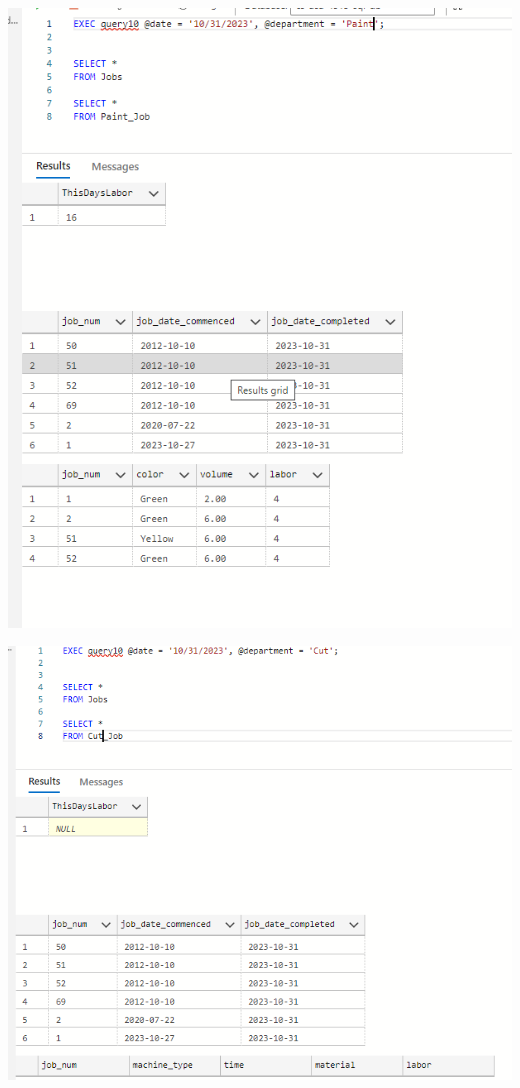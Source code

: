 \documentclass[11pt]{article}
\begin{document}
\begin{enumerate}
\includegraphics[width = \textwidth]{deptjob2.png}

\includegraphics[width = \textwidth]{deptjob3.png}


\end{enumerate}
\end{document}
